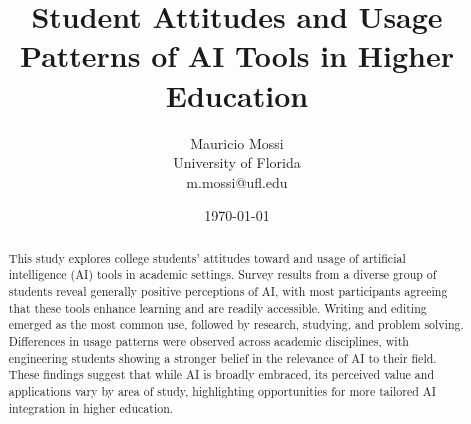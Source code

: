 \documentclass[12pt]{article}
\title{Student Attitudes and Usage Patterns of AI Tools in Higher Education}
\author{Mauricio Mossi \\ University of Florida \\ m.mossi@ufl.edu}
\date{\today}
\begin{document}
\maketitle
\begin{abstract}
This study explores college students’ attitudes toward and usage of artificial intelligence (AI) tools in academic settings. Survey results from a diverse group of students reveal generally positive perceptions of AI, with most participants agreeing that these tools enhance learning and are readily accessible. Writing and editing emerged as the most common use, followed by research, studying, and problem solving. Differences in usage patterns were observed across academic disciplines, with engineering students showing a stronger belief in the relevance of AI to their field. These findings suggest that while AI is broadly embraced, its perceived value and applications vary by area of study, highlighting opportunities for more tailored AI integration in higher education.
\end{abstract}

\tableofcontents
\newpage

\end{document}
